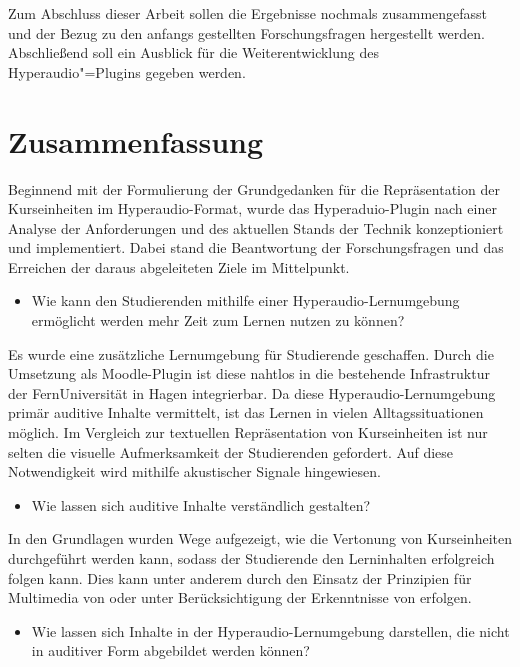 Zum Abschluss dieser Arbeit sollen die Ergebnisse nochmals zusammengefasst und der Bezug zu den anfangs gestellten Forschungsfragen hergestellt werden. Abschließend soll ein Ausblick für die Weiterentwicklung des Hyperaudio"=Plugins gegeben werden.

\section{Zusammenfassung}
Beginnend mit der Formulierung der Grundgedanken für die Repräsentation der Kurseinheiten im Hyperaudio-Format, wurde das Hyperaduio-Plugin nach einer Analyse der Anforderungen und des aktuellen Stands der Technik konzeptioniert und implementiert. Dabei stand die Beantwortung der Forschungsfragen und das Erreichen der daraus abgeleiteten Ziele im Mittelpunkt.

\begin{itemize}
\item Wie kann den Studierenden mithilfe einer Hyperaudio-Lernumgebung ermöglicht werden mehr Zeit zum Lernen nutzen zu können?
\end{itemize}

Es wurde eine zusätzliche Lernumgebung für Studierende geschaffen. Durch die Umsetzung als Moodle-Plugin ist diese nahtlos in die bestehende Infrastruktur der FernUniversität in Hagen integrierbar. Da diese Hyperaudio-Lernumgebung primär auditive Inhalte vermittelt, ist das Lernen in vielen Alltagssituationen möglich. Im Vergleich zur textuellen Repräsentation von Kurseinheiten ist nur selten die visuelle Aufmerksamkeit der Studierenden gefordert. Auf diese Notwendigkeit wird mithilfe akustischer Signale hingewiesen.

\begin{itemize}
\item Wie lassen sich auditive Inhalte verständlich gestalten?
\end{itemize}

In den Grundlagen wurden Wege aufgezeigt, wie die Vertonung von Kurseinheiten durchgeführt werden kann, sodass der Studierende den Lerninhalten erfolgreich folgen kann. Dies kann unter anderem durch den Einsatz der Prinzipien für Multimedia von \cite{mayer2009multimedia} oder unter Berücksichtigung der Erkenntnisse von \cite{donker2007gestaltung} erfolgen.

\begin{itemize}
\item Wie lassen sich Inhalte in der Hyperaudio-Lernumgebung darstellen, die nicht in auditiver Form abgebildet werden können?
\end{itemize}

